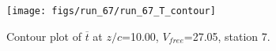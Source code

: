 \begin{figure}[H]
\centering
\texttt{[image: figs/run\_67/run\_67\_T\_contour]}
\caption{Contour plot of $\overline{t}$ at $z/c$=10.00, $V_{free}$=27.05, station 7.}
\label{fig:run_67_T_contour}
\end{figure}


